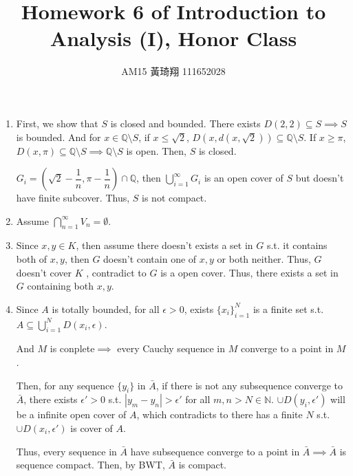 \documentclass[12pt]{article}
\title{Homework 6 of Introduction to Analysis (I), Honor Class}
\author{AM15 黃琦翔 111652028}
\begin{document}
\maketitle
\begin{enumerate}
    \item First, we show that $S$ is closed and bounded. There exists $D(2, 2) \subseteq S\implies S$ is bounded.
    And for $x\in \mathbb{Q}\setminus S$, if $x\leq \sqrt{2}$, $D(x, d(x, \sqrt{2}))\subseteq \mathbb{Q}\setminus S$. If $x\geq \pi$, $D(x, \pi) \subseteq \mathbb{Q}\setminus S\implies \mathbb{Q}\setminus S$ is open.
    Then, $S$ is closed.

    $G_i = (\sqrt{2} - \dfrac{1}{n}, \pi - \dfrac{1}{n}) \cap \mathbb{Q}$, then $\displaystyle\bigcup_{i=1}^{\infty} G_i$ is an open cover of $S$ but doesn't have finite subcover.
    Thus, $S$ is not compact.

    \item Assume $\displaystyle\bigcap_{n=1}^{\infty} V_n = \emptyset$.
    

    
    \item Since $x, y\in K$, then assume there doesn't exists a set in $G$ s.t. it contains both of $x, y$, then $G$ doesn't contain one of $x, y$ or both neither.
    Thus, $G$ doesn't cover $K$ , contradict to $G$ is a open cover. Thus, there exists a set in $G$ containing both $x, y$.

    \item Since $A$ is totally bounded, for all $\epsilon > 0$, exists $\lbrace x_i\rbrace_{i=1}^N$ is a finite set s.t. $A \subseteq \displaystyle\bigcup_{i=1}^N D(x_i, \epsilon)$.
    
    And $M$ is conplete$\implies$ every Cauchy sequence in $M$ converge to a point in $M$.

    Then, for any sequence $\lbrace y_i\rbrace$ in $\bar{A}$, if there is not any subsequence converge to $\bar{A}$, there exists $\epsilon' > 0$ s.t. $|y_m-y_n| > \epsilon'$ for all $m, n > N\in \mathbb{N}$.
    $\cup D(y_i, \epsilon')$ will be a infinite open cover of $A$, which contradicts to there has a finite $N$ s.t. $\cup D(x_i, \epsilon')$ is cover of $A$.

    Thus, every sequence in $\bar{A}$ have subsequence converge to a point in $\bar{A}\implies \bar{A}$ is sequence compact.
    Then, by BWT, $\bar{A}$ is compact.
\end{enumerate}
\end{document}
